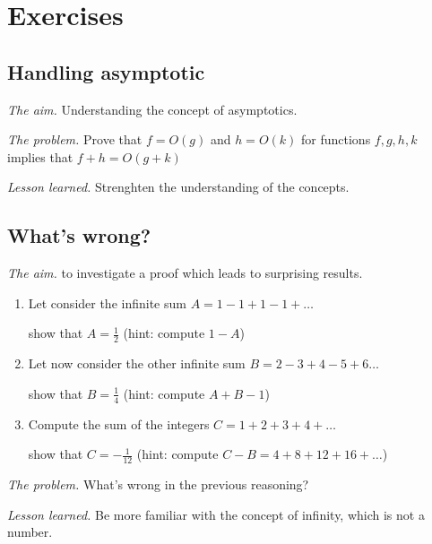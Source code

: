 
\section{Exercises}

\subsection{Handling asymptotic}

\noindent \textit{The aim.}
Understanding the concept of asymptotics.
\medskip

\noindent \textit{The problem.}
Prove that $f = O(g)$ and $h = O(k)$ for functions $f,g,h,k$ implies that
$f+h = O(g+k)$
\medskip

\noindent \textit{Lesson learned.}
Strenghten the understanding of the concepts. 


\subsection{What's wrong?}

\noindent \textit{The aim.}
to investigate a proof which leads to surprising results.

\begin{enumerate}
\item
Let consider the infinite sum $A = 1-1+1-1+ \ldots$

show that $A=\frac{1}{2}$ (hint: compute $1-A$)
\item
Let now consider the other infinite sum $B=2-3+4-5+6 \ldots$

show that $B=\frac{1}{4}$ (hint: compute $A+B-1$)
\item 
Compute the sum of the integers $C=1+2+3+4+ \ldots$

show that $C=-\frac{1}{12}$ (hint: compute $C-B=4+8+12+16+ \ldots$)
\end{enumerate}
\medskip

\noindent \textit{The problem.}
What's wrong in the previous reasoning?
\medskip

\noindent \textit{Lesson learned.}
Be more familiar with the concept of infinity, which is not a number.



